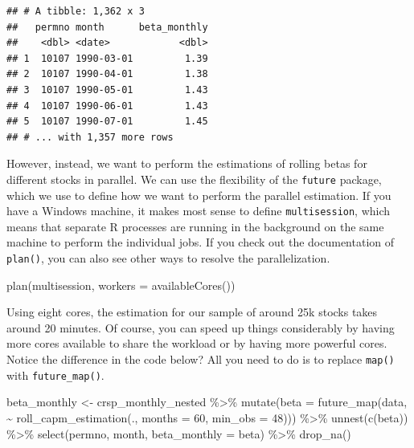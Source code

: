 \documentclass[
]{krantz}
\newenvironment{Shaded}{\begin{snugshade}}{\end{snugshade}}
\newcommand{\AttributeTok}[1]{\textcolor[rgb]{0.61,0.61,0.61}{#1}}
\newcommand{\DecValTok}[1]{\textcolor[rgb]{0.06,0.06,0.06}{#1}}
\newcommand{\FunctionTok}[1]{\textcolor[rgb]{0,0,0}{#1}}
\newcommand{\NormalTok}[1]{#1}
\newcommand{\OtherTok}[1]{\textcolor[rgb]{0.37,0.37,0.37}{#1}}
\newcommand{\SpecialCharTok}[1]{\textcolor[rgb]{0,0,0}{#1}}
\begin{document}
\begin{verbatim}
## # A tibble: 1,362 x 3
##   permno month      beta_monthly
##    <dbl> <date>            <dbl>
## 1  10107 1990-03-01         1.39
## 2  10107 1990-04-01         1.38
## 3  10107 1990-05-01         1.43
## 4  10107 1990-06-01         1.43
## 5  10107 1990-07-01         1.45
## # ... with 1,357 more rows
\end{verbatim}

However, instead, we want to perform the estimations of rolling betas for different stocks in parallel. We can use the flexibility of the \texttt{future} package, which we use to define how we want to perform the parallel estimation. If you have a Windows machine, it makes most sense to define \texttt{multisession}, which means that separate R processes are running in the background on the same machine to perform the individual jobs. If you check out the documentation of \texttt{plan()}, you can also see other ways to resolve the parallelization.

\begin{Shaded}
\begin{Highlighting}[]
\FunctionTok{plan}\NormalTok{(multisession, }\AttributeTok{workers =} \FunctionTok{availableCores}\NormalTok{())}
\end{Highlighting}
\end{Shaded}

Using eight cores, the estimation for our sample of around 25k stocks takes around 20 minutes. Of course, you can speed up things considerably by having more cores available to share the workload or by having more powerful cores. Notice the difference in the code below? All you need to do is to replace \texttt{map()} with \texttt{future\_map()}.

\begin{Shaded}
\begin{Highlighting}[]
\NormalTok{beta\_monthly }\OtherTok{\textless{}{-}}\NormalTok{ crsp\_monthly\_nested }\SpecialCharTok{\%\textgreater{}\%}
  \FunctionTok{mutate}\NormalTok{(}\AttributeTok{beta =} \FunctionTok{future\_map}\NormalTok{(data, }\SpecialCharTok{\textasciitilde{}} \FunctionTok{roll\_capm\_estimation}\NormalTok{(., }\AttributeTok{months =} \DecValTok{60}\NormalTok{, }\AttributeTok{min\_obs =} \DecValTok{48}\NormalTok{))) }\SpecialCharTok{\%\textgreater{}\%}
  \FunctionTok{unnest}\NormalTok{(}\FunctionTok{c}\NormalTok{(beta)) }\SpecialCharTok{\%\textgreater{}\%}
  \FunctionTok{select}\NormalTok{(permno, month, }\AttributeTok{beta\_monthly =}\NormalTok{ beta) }\SpecialCharTok{\%\textgreater{}\%}
  \FunctionTok{drop\_na}\NormalTok{()}
\end{Highlighting}
\end{Shaded}
\end{document}
